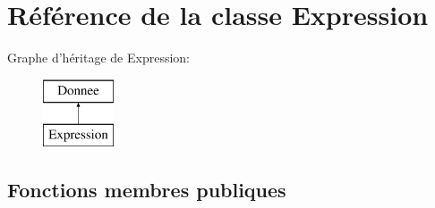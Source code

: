 \hypertarget{class_expression}{\section{Référence de la classe Expression}
\label{class_expression}
}
Graphe d'héritage de Expression\-:\begin{figure}[H]
\begin{center}
\leavevmode
\includegraphics[height=2.000000cm]{class_expression}
\end{center}
\end{figure}
\subsection*{Fonctions membres publiques}
